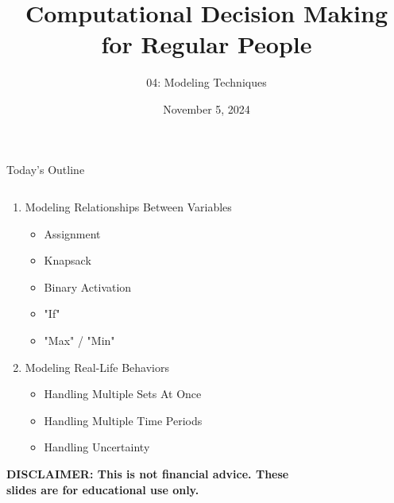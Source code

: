 \documentclass[10pt, aspectratio=169]{beamer}
\title{Computational Decision Making for Regular People}
\subtitle{04: Modeling Techniques}
\date{November 5, 2024}
\begin{document}
\begin{frame}
    \maketitle
\end{frame}

\begin{frame}{Today's Outline}
    \begin{columns}
        \begin{column}{0.5\textwidth}
            \begin{enumerate}
                \item Modeling Relationships Between Variables
                \begin{itemize}
                    \item Assignment
                    \item Knapsack 
                    \item Binary Activation
                    \item "If"
                    \item "Max" / "Min"
                \end{itemize}
                \item Modeling Real-Life Behaviors
                \begin{itemize}
                    \item Handling Multiple Sets At Once
                    \item Handling Multiple Time Periods
                    \item Handling Uncertainty
                \end{itemize}
            \end{enumerate}
            {\footnotesize \textbf{DISCLAIMER: This is not financial advice. These slides are for educational use only.}}
        \end{column}
        \begin{column}{0.5\textwidth}
            \begin{figure}
                \begin{figure}

\end{figure}
\end{figure}
\end{column}
\end{columns}
\end{frame}
\end{document}

